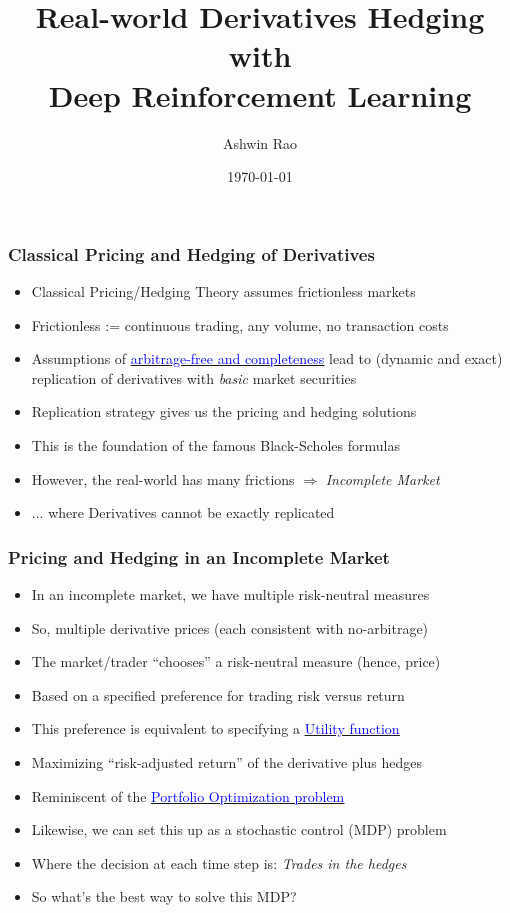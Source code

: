 \documentclass{beamer}
\title[Deep Hedging]{Real-world Derivatives Hedging with \\ Deep Reinforcement Learning} %
\author{Ashwin Rao} %
\institute[Stanford] %
{
ICME, Stanford University
}
\date{\today} %
\begin{document}
\begin{frame}
\titlepage %
\end{frame}

\begin{frame}
\frametitle{Classical Pricing and Hedging of Derivatives}
\begin{itemize}
\item Classical Pricing/Hedging Theory assumes frictionless markets
\item Frictionless := continuous trading, any volume, no transaction costs
\item Assumptions of \href{https://github.com/coverdrive/technical-documents/blob/master/finance/ArbitrageCompleteness.pdf}{\underline{\textcolor{blue}{arbitrage-free and completeness}}}
lead to (dynamic and exact) replication of derivatives with {\em basic} market securities
\item Replication strategy gives us the pricing and hedging solutions
\item This is the foundation of the famous Black-Scholes formulas
\item However, the real-world has many frictions $\Rightarrow$ {\em Incomplete Market}
\item ... where Derivatives cannot be exactly replicated
\end{itemize}
\end{frame}

\begin{frame}
\frametitle{Pricing and Hedging in an Incomplete Market}
\begin{itemize}
\item In an incomplete market, we have multiple risk-neutral measures
\item So, multiple derivative prices (each consistent with no-arbitrage)
\item The market/trader ``chooses'' a risk-neutral measure (hence, price)
\item Based on a specified preference for trading risk versus return
\item This preference is equivalent to specifying a \href{https://github.com/coverdrive/technical-documents/blob/master/finance/cme241/UtilityTheoryForRisk.pdf}{\underline{\textcolor{blue}{Utility function}}}
\item Maximizing ``risk-adjusted return'' of the derivative plus hedges
\item Reminiscent of the \href{https://github.com/coverdrive/technical-documents/blob/master/finance/cme241/MertonPortfolio.pdf}{\underline{\textcolor{blue}{Portfolio Optimization problem}}}
\item Likewise, we can set this up as a stochastic control (MDP) problem
\item Where the decision at each time step is: {\em Trades in the hedges}
\item So what's the best way to solve this MDP?
\end{itemize}
\end{frame}
\end{document}

